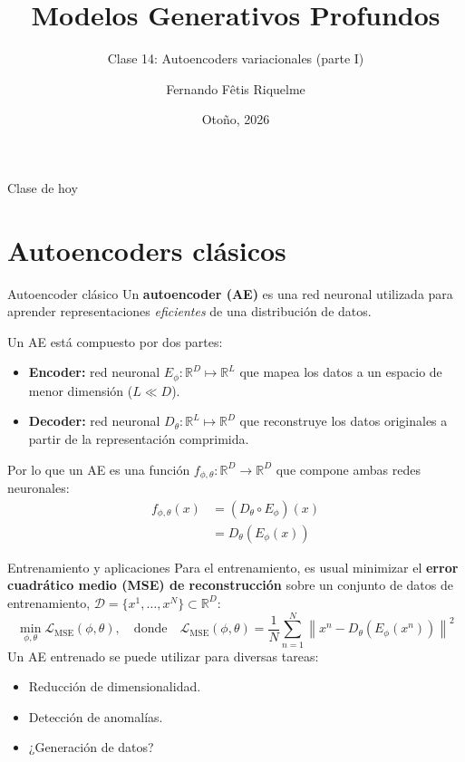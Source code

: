 \documentclass{beamer}
\title{Modelos Generativos Profundos}
\subtitle{Clase 14: Autoencoders variacionales (parte I)}
\author{Fernando Fêtis Riquelme}
\institute{
    Facultad de Ciencias Físicas y Matemáticas\\
    Universidad de Chile
}
\date{Otoño, 2026}
\newcommand{\R}{\mathbb{R}}
\begin{document}
\begin{frame}
    \titlepage
\end{frame}

\begin{frame}{Clase de hoy}
    \tableofcontents
\end{frame}

\section{Autoencoders clásicos}

\begin{frame}{Autoencoder clásico}
    Un \textbf{autoencoder (AE)} es una red neuronal utilizada para aprender representaciones \textit{eficientes} de una distribución de datos.

    Un AE está compuesto por dos partes:
    \begin{itemize}
        \item \textbf{Encoder:} red neuronal $E_\phi:\R^D\mapsto\R^L$ que mapea los datos a un espacio de menor dimensión ($L\ll D$).
        \item \textbf{Decoder:} red neuronal $D_\theta:\R^L\mapsto\R^D$ que reconstruye los datos originales a partir de la representación comprimida.
    \end{itemize}
    Por lo que un AE es una función $f_{\phi,\theta}:\R^D\to\R^D$ que compone ambas redes neuronales:
    \begin{align*}
        f_{\phi,\theta}(x) & = (D_\theta\circ E_\phi)(x) \\
                           & = D_\theta(E_\phi(x))
    \end{align*}
\end{frame}

\begin{frame}{Entrenamiento y aplicaciones}
    Para el entrenamiento, es usual minimizar el \textbf{error cuadrático medio (MSE) de reconstrucción} sobre un conjunto de datos de entrenamiento, $\mathcal{D}=\{x^1,\ldots,x^N\}\subset\R^D$:
    \begin{equation*}
        \min_{\phi,\theta} \mathcal{L}_{\text{MSE}}(\phi,\theta),
        \quad\text{donde}\quad
        \mathcal{L}_{\text{MSE}}(\phi,\theta) = \frac{1}{N}\sum_{n=1}^N \left\|x^n - D_\theta(E_\phi(x^n))\right\|^2
    \end{equation*}
    Un AE entrenado se puede utilizar para diversas tareas:
    \begin{itemize}
        \item Reducción de dimensionalidad.
        \item Detección de anomalías.
        \item ¿Generación de datos?
    \end{itemize}
\end{frame}
\end{document}
